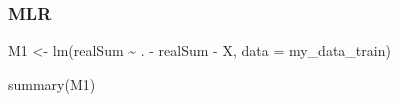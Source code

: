 \documentclass[
]{article}
\newenvironment{Shaded}{\begin{snugshade}}{\end{snugshade}}
\newcommand{\AttributeTok}[1]{\textcolor[rgb]{0.77,0.63,0.00}{#1}}
\newcommand{\ConstantTok}[1]{\textcolor[rgb]{0.00,0.00,0.00}{#1}}
\newcommand{\FunctionTok}[1]{\textcolor[rgb]{0.00,0.00,0.00}{#1}}
\newcommand{\NormalTok}[1]{#1}
\newcommand{\OtherTok}[1]{\textcolor[rgb]{0.56,0.35,0.01}{#1}}
\newcommand{\SpecialCharTok}[1]{\textcolor[rgb]{0.00,0.00,0.00}{#1}}
\begin{document}
\begin{Shaded}
\end{Shaded}

\hypertarget{mlr}{%
\subsubsection{MLR}\label{mlr}}

\begin{Shaded}
\begin{Highlighting}[]
\NormalTok{M1 }\OtherTok{\textless{}{-}} \FunctionTok{lm}\NormalTok{(realSum }\SpecialCharTok{\textasciitilde{}}\NormalTok{ . }\SpecialCharTok{{-}}\NormalTok{ realSum }\SpecialCharTok{{-}}\NormalTok{ X, }\AttributeTok{data =}\NormalTok{ my\_data\_train)}
\end{Highlighting}
\end{Shaded}

\begin{Shaded}
\begin{Highlighting}[]
\FunctionTok{summary}\NormalTok{(M1)}
\end{Highlighting}
\end{Shaded}
\end{document}
